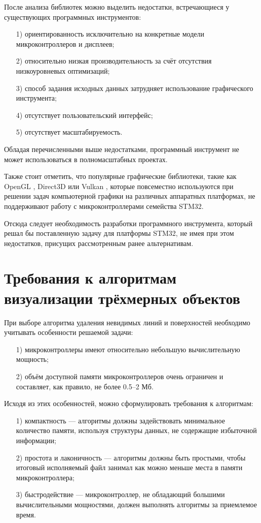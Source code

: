 После анализа библиотек можно выделить недостатки, встречающиеся у существующих программных инструментов:
\begin{enumerate}
	\item[1)] ориентированность исключительно на конкретные модели микроконтроллеров и дисплеев;
	\item[2)] относительно низкая производительность за счёт отсутствия низкоуровневых оптимизаций;
	\item[3)] способ задания исходных данных затрудняет использование графического инструмента;
	\item[4)] отсутствует пользовательский интерфейс;
	\item[5)] отсутствует масштабируемость.
\end{enumerate}

Обладая перечисленными выше недостатками, программный инструмент не может использоваться в полномасштабных проектах.

Также стоит отметить, что популярные графические библиотеки, такие как OpenGL \cite{opengl}, Direct3D \cite{direct3d} или Vulkan \cite{vulkan}, которые повсеместно используются при решении задач компьютерной графики на различных аппаратных платформах, не поддерживают работу с микроконтроллерами семейства STM32.

Отсюда следует необходимость разработки программного инструмента, который решал бы поставленную задачу для платформы STM32, не имея при этом недостатков, присущих рассмотренным ранее альтернативам.

\section{Требования к алгоритмам визуализации трёхмерных объектов}
При выборе алгоритма удаления невидимых линий и поверхностей необходимо учитывать особенности решаемой задачи:
\begin{enumerate}
	\item[1)] микроконтроллеры имеют относительно небольшую вычислительную мощность;
	\item[2)] объём доступной памяти микроконтроллеров очень ограничен и составляет, как правило, не более 0.5–2 Мб.
\end{enumerate}

Исходя из этих особенностей, можно сформулировать требования к алгоритмам:
\begin{enumerate}
	\item[1)] компактность --- алгоритмы должны задействовать минимальное количество памяти, используя структуры данных, не содержащие избыточной информации;
	\item[2)] простота и лаконичность --- алгоритмы должны быть простыми, чтобы итоговый исполняемый файл занимал как можно меньше места в памяти микроконтроллера;
	\item[3)] быстродействие --- микроконтроллер, не обладающий большими вычислительными мощностями, должен выполнять алгоритмы за приемлемое время.
\end{enumerate}

